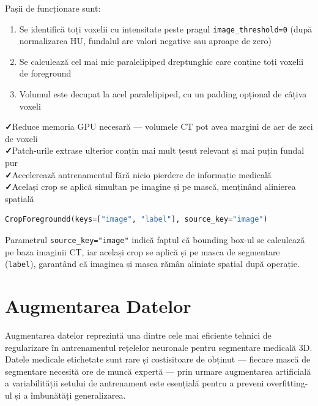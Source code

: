 \documentclass[12pt, a4paper]{report}
\newcommand{\pro}{\textcolor{accentgreen}{\textbf{✓}}\;}
\begin{document}
Pașii de funcționare sunt:
\begin{enumerate}
    \item Se identifică toți voxelii cu intensitate peste pragul \texttt{image\_threshold=0}
          (după normalizarea HU, fundalul are valori negative sau aproape de zero)
    \item Se calculează cel mai mic paralelipiped dreptunghic care conține toți voxelii de foreground
    \item Volumul este decupat la acel paralelipiped, cu un padding opțional de câțiva voxeli
\end{enumerate}

\begin{goodbox}
\pro Reduce memoria GPU necesară — volumele CT pot avea margini de aer de zeci de voxeli \\
\pro Patch-urile extrase ulterior conțin mai mult țesut relevant și mai puțin fundal pur \\
\pro Accelerează antrenamentul fără nicio pierdere de informație medicală \\
\pro Același crop se aplică simultan pe imagine și pe mască, menținând alinierea spațială
\end{goodbox}

\begin{lstlisting}[language=Python]
CropForegroundd(keys=["image", "label"], source_key="image")
\end{lstlisting}

Parametrul \texttt{source\_key="image"} indică faptul că bounding box-ul se calculează
pe baza imaginii CT, iar același crop se aplică și pe masca de segmentare (\texttt{label}),
garantând că imaginea și masca rămân aliniate spațial după operație.

\chapter{Augmentarea Datelor}

Augmentarea datelor reprezintă una dintre cele mai eficiente tehnici de regularizare
în antrenamentul rețelelor neuronale pentru segmentare medicală 3D. Datele medicale
etichetate sunt rare și costisitoare de obținut — fiecare mască de segmentare necesită
ore de muncă expertă — prin urmare augmentarea artificială a variabilității setului de
antrenament este esențială pentru a preveni overfitting-ul și a îmbunătăți generalizarea.
\end{document}
